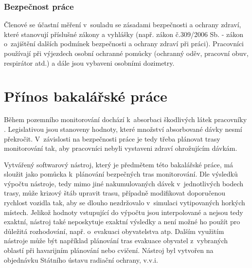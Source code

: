 \subsubsection{Bezpečnost práce}

Členové  se účastní měření v~souladu se zásadami bezpečnosti a
ochrany zdraví, které stanovují příslušné zákony a vyhlášky
(např. zákon č.309/2006 Sb. - zákon o~zajištění dalších podmínek
bezpečnosti a ochrany zdraví při práci). Pracovníci používají při
výjezdech osobní ochranné pomůcky (ochranný oděv, pracovní obuv,
respirátor atd.) a dále jsou vybaveni osobními dozimetry.

\section{Přínos bakalářské práce} Během pozemního monitorování dochází
k~absorbaci škodlivých látek pracovníky . Legislativou jsou
stanoveny hodnoty, které množství absorbované dávky nesmí
překročit. V~závislosti na bezpečnosti práce je tedy třeba plánovat
trasy monitorování tak, aby pracovníci  nebyli vystaveni zdraví
ohrožujícím dávkám.

Vytvářený softwarový nástroj, který je předmětem této bakalářské
práce, má sloužit jako pomůcka k~plánování bezpečných tras
monitorování. Dle výsledků výpočtu nástroje, tedy mimo jiné
nakumulovaných dávek v~jednotlivých bodech trasy, může krizový štáb
upravit trasu, případně modifikovat doporučenou rychlost vozidla tak,
aby se dlouho nezdržovalo v~simulaci vytipovaných horkých
místech. Jelikož hodnoty vstupující do výpočtu jsou interpolované a
nejsou tedy exaktní, nástroj také neposkytuje exaktní výsledky a není
možné ho použít pro důležitá rozhodování, např. o~evakuaci
obyvatelstva atp. Dalším využitím nástroje může být například
plánování tras evakuace obyvatel z~vybraných oblastí při havarijním
plánování nebo cvičení. Nástroj byl vytvořen na objednávku Státního
ústavu radiační ochrany, v.v.i.